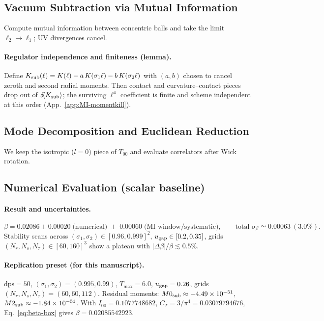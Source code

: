 \documentclass[aps,prd,onecolumn,superscriptaddress,nofootinbib]{revtex4-2}
\begin{document}
\subsection{Vacuum Subtraction via Mutual Information}
Compute mutual information between concentric balls and take the limit \(\ell_2\!\to\!\ell_1\); UV divergences cancel.

\paragraph*{Regulator independence and finiteness (lemma).}
Define
\(
K_{\rm sub}(\ell)=K(\ell)-a\,K(\sigma_1\ell)-b\,K(\sigma_2\ell)
\)
with \((a,b)\) chosen to cancel zeroth and second radial moments. Then contact and curvature–contact pieces drop out of \(\delta\!\langle K_{\rm sub}\rangle\); the surviving \(\ell^4\) coefficient is finite and scheme independent at this order (App.~\ref{app:MI-momentkill}).

\subsection{Mode Decomposition and Euclidean Reduction}
We keep the isotropic (\(l=0\)) piece of \(T_{00}\) and evaluate correlators after Wick rotation.

\subsection{Numerical Evaluation (scalar baseline)}
\paragraph*{Result and uncertainties.}
\begin{equation}
\beta = 0.02086 \pm 0.00020\;\text{(numerical)} \;\pm\; 0.00060\;\text{(MI-window/systematic)},\qquad \text{total }\sigma_\beta \simeq 0.00063~(3.0\%).
\end{equation}
Stability scans across \((\sigma_1,\sigma_2)\in[0.96,0.999]^2\), \(u_{\rm gap}\in[0.2,0.35]\), grids \((N_r,N_s,N_\tau)\in[60,160]^3\) show a plateau with \(|\Delta\beta|/\beta \lesssim 0.5\%\).

\paragraph*{Replication preset (for this manuscript).}
\(\mathrm{dps}=50\), \((\sigma_1,\sigma_2)=(0.995,0.99)\), \(T_{\max}=6.0\), \(u_{\rm gap}=0.26\), grids \((N_r,N_s,N_\tau)=(60,60,112)\). Residual moments: \(M0_{\rm sub}\approx-4.49\times 10^{-51}\), \(M2_{\rm sub}\approx-1.84\times 10^{-51}\). With \(I_{00}=0.1077748682\), \(C_T=3/\pi^4=0.03079794676\), Eq.~\eqref{eq:beta-box} gives \(\beta=0.02085542923\).
\end{document}
